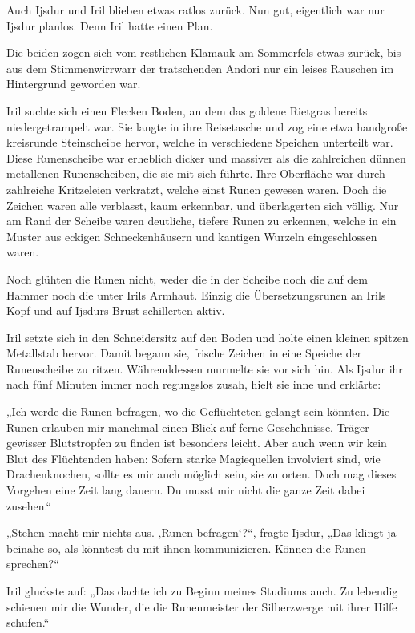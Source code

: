 Auch Ijsdur und Iril blieben etwas ratlos zurück. Nun gut, eigentlich war nur Ijsdur planlos. Denn Iril hatte einen Plan.

Die beiden zogen sich vom restlichen Klamauk am Sommerfels etwas zurück, bis aus dem Stimmenwirrwarr der tratschenden Andori nur ein leises Rauschen im Hintergrund geworden war.

Iril suchte sich einen Flecken Boden, an dem das goldene Rietgras bereits niedergetrampelt war. Sie langte in ihre Reisetasche und zog eine etwa handgroße kreisrunde Steinscheibe hervor, welche in verschiedene Speichen unterteilt war. Diese Runenscheibe war erheblich dicker und massiver als die zahlreichen dünnen metallenen Runenscheiben, die sie mit sich führte. Ihre Oberfläche war durch zahlreiche Kritzeleien verkratzt, welche einst Runen gewesen waren. Doch die Zeichen waren alle verblasst, kaum erkennbar, und überlagerten sich völlig. Nur am Rand der Scheibe waren deutliche, tiefere Runen zu erkennen, welche in ein Muster aus eckigen Schneckenhäusern und kantigen Wurzeln eingeschlossen waren.

Noch glühten die Runen nicht, weder die in der Scheibe noch die auf dem Hammer noch die unter Irils Armhaut. Einzig die Übersetzungsrunen an Irils Kopf und auf Ijsdurs Brust schillerten aktiv.

Iril setzte sich in den Schneidersitz auf den Boden und holte einen kleinen spitzen Metallstab hervor. Damit begann sie, frische Zeichen in eine Speiche der Runenscheibe zu ritzen. Währenddessen murmelte sie vor sich hin. Als Ijsdur ihr nach fünf Minuten immer noch regungslos zusah, hielt sie inne und erklärte:

„Ich werde die Runen befragen, wo die Geflüchteten gelangt sein könnten. Die Runen erlauben mir manchmal einen Blick auf ferne Geschehnisse. Träger gewisser Blutstropfen zu finden ist besonders leicht. Aber auch wenn wir kein Blut des Flüchtenden haben: Sofern starke Magiequellen involviert sind, wie Drachenknochen, sollte es mir auch möglich sein, sie zu orten. Doch mag dieses Vorgehen eine Zeit lang dauern. Du musst mir nicht die ganze Zeit dabei zusehen.“

„Stehen macht mir nichts aus. ‚Runen befragen‘?“, fragte Ijsdur, „Das klingt ja beinahe so, als könntest du mit ihnen kommunizieren. Können die Runen sprechen?“

Iril gluckste auf: „Das dachte ich zu Beginn meines Studiums auch. Zu lebendig schienen mir die Wunder, die die Runenmeister der Silberzwerge mit ihrer Hilfe schufen.“

